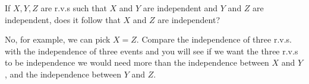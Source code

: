 
\setcounter{theorem}{16}
\begin{exercise}[BH.3.41]
  If $X, Y,Z$ are r.v.s such that $X$ and $Y$ are independent and $Y$ and $Z$ are independent,
    does it follow that $X$ and $Z$ are independent?
    \begin{solution}
        No, for example, we can pick $X=Z$. Compare the independence of three r.v.s. with the independence of three events and you will see if we want the three r.v.s to be independence we would need more than the independence between  $X$ and $Y$, and the independence between $Y$ and $Z$.
    \end{solution}
\end{exercise}



